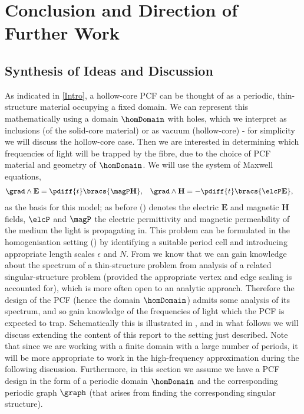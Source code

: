 \chapter{Conclusion and Direction of Further Work} \label{ch:WorkDirection}

\section{Synthesis of Ideas and Discussion}
As indicated in \cref{Intro}, a hollow-core PCF can be thought of as a periodic, thin-structure material occupying a fixed domain.
We can represent this mathematically using a domain $\homDomain$ with holes, which we interpret as inclusions (of the solid-core material) or as vacuum (hollow-core) - for simplicity we will discuss the hollow-core case.
Then we are interested in determining which frequencies of light will be trapped by the fibre, due to the choice of PCF material and geometry of $\homDomain$.
We will use the system of Maxwell equations,
\begin{align} \label{eq:MaxwellSystem}
	\grad\wedge\mathbf{E} = \pdiff{t}\bracs{\magP \mathbf{H}}, &\quad
	\grad\wedge\mathbf{H} = -\pdiff{t}\bracs{\elcP \mathbf{E}},
\end{align}
as the basis for this model; as before () denotes the electric $\mathbf{E}$ and magnetic $\mathbf{H}$ fields, $\elcP$ and $\magP$ the electric permittivity and magnetic permeability of the medium the light is propagating in.
This problem can be formulated in the homogenisation setting () by identifying a suitable period cell and introducing appropriate length scales $\epsilon$ and $N$.
From  we know that we can gain knowledge about the spectrum of a thin-structure problem from analysis of a related singular-structure problem (provided the appropriate vertex and edge scaling is accounted for), which is more often open to an analytic approach.
Therefore the design of the PCF (hence the domain $\homDomain$) admits some analysis of its spectrum, and so gain knowledge of the frequencies of light which the PCF is expected to trap.
Schematically this is illustrated in , and in what follows we will discuss extending the content of this report to the setting just described.
Note that since we are working with a finite domain with a large number of periods, it will be more appropriate to work in the high-frequency approximation during the following discussion.
Furthermore, in this section we assume we have a PCF design in the form of a periodic domain $\homDomain$  and the corresponding periodic graph $\graph$ (that arises from finding the corresponding singular structure).
